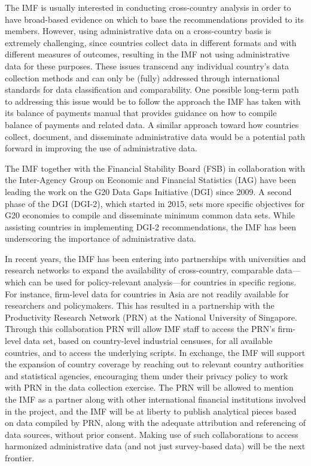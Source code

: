\documentclass[
]{book}
\begin{document}
The IMF is usually interested in conducting cross-country analysis in order to have broad-based evidence on which to base the recommendations provided to its members. However, using administrative data on a cross-country basis is extremely challenging, since countries collect data in different formats and with different measures of outcomes, resulting in the IMF not using administrative data for these purposes. These issues transcend any individual country's data collection methods and can only be (fully) addressed through international standards for data classification and comparability. One possible long-term path to addressing this issue would be to follow the approach the IMF has taken with its balance of payments manual that provides guidance on how to compile balance of payments and related data. A similar approach toward how countries collect, document, and disseminate administrative data would be a potential path forward in improving the use of administrative data.

The IMF together with the Financial Stability Board (FSB) in collaboration with the Inter-Agency Group on Economic and Financial Statistics (IAG) have been leading the work on the G20 Data Gaps Initiative (DGI) since 2009. A second phase of the DGI (DGI-2), which started in 2015, sets more specific objectives for G20 economies to compile and disseminate minimum common data sets. While assisting countries in implementing DGI-2 recommendations, the IMF has been underscoring the importance of administrative data.

In recent years, the IMF has been entering into partnerships with universities and research networks to expand the availability of cross-country, comparable data--- which can be used for policy-relevant analysis---for countries in specific regions. For instance, firm-level data for countries in Asia are not readily available for researchers and policymakers. This has resulted in a partnership with the Productivity Research Network (PRN) at the National University of Singapore. Through this collaboration PRN will allow IMF staff to access the PRN's firm-level data set, based on country-level industrial censuses, for all available countries, and to access the underlying scripts. In exchange, the IMF will support the expansion of country coverage by reaching out to relevant country authorities and statistical agencies, encouraging them under their privacy policy to work with PRN in the data collection exercise. The PRN will be allowed to mention the IMF as a partner along with other international financial institutions involved in the project, and the IMF will be at liberty to publish analytical pieces based on data compiled by PRN, along with the adequate attribution and referencing of data sources, without prior consent. Making use of such collaborations to access harmonized administrative data (and not just survey-based data) will be the next frontier.
\end{document}
